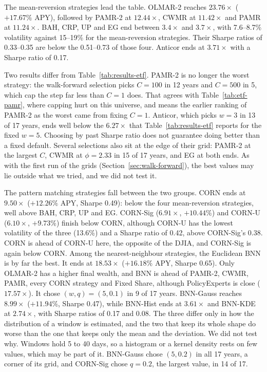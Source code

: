 \documentclass[11pt]{article}
\begin{document}
The mean-reversion strategies lead the table. OLMAR-2 reaches
$23.76\times$ ($+17.67\%$ APY), followed by PAMR-2 at $12.44\times$, CWMR
at $11.42\times$ and PAMR at $11.24\times$. BAH, CRP, UP and EG end between
$3.4\times$ and $3.7\times$, with 7.6--8.7\% volatility against 15--19\%
for the mean-reversion strategies. Their Sharpe ratios of 0.33--0.35 are
below the 0.51--0.73 of those four. Anticor ends at $3.71\times$ with a
Sharpe ratio of 0.17.

Two results differ from Table~\ref{tab:results-etf}. PAMR-2 is no longer
the worst strategy: the walk-forward selection picks $C=100$ in 12 years
and $C=500$ in 5, which cap the step far less than $C=1$ does. That
agrees with Table~\ref{tab:etf-pamr}, where capping hurt on this universe,
and means the earlier ranking of PAMR-2 as the worst came from fixing
$C=1$. Anticor, which picks $w=3$ in 13 of 17 years, ends well below the
$6.27\times$ that Table~\ref{tab:results-etf} reports for the fixed $w=5$.
Choosing by past Sharpe ratio does not guarantee doing better than a fixed
default. Several selections also sit at the edge of their grid: PAMR-2 at
the largest $C$, CWMR at $\phi=2.33$ in 15 of 17 years, and EG at both
ends. As with the first run of the grids (Section~\ref{sec:walk-forward}),
the best values may lie outside what we tried, and we did not test it.

The pattern matching strategies fall between the two groups. CORN ends at
$9.50\times$ ($+12.26\%$ APY, Sharpe 0.49): below the four
mean-reversion strategies, well above BAH, CRP, UP and EG. CORN-Sig
($6.91\times$, $+10.44\%$) and CORN-U ($6.10\times$, $+9.73\%$) finish
below CORN, although CORN-U has the lowest volatility of the three (13.6\%)
and a Sharpe ratio of 0.42, above CORN-Sig's 0.38. CORN is ahead
of CORN-U here, the opposite of the DJIA, and CORN-Sig is again below CORN.
Among the nearest-neighbour strategies, the Euclidean BNN is by far the
best. It ends at $18.53\times$ ($+16.18\%$ APY, Sharpe 0.65). Only
OLMAR-2 has a higher final wealth, and BNN is ahead of
PAMR-2, CWMR, PAMR, every CORN strategy and Fixed Share, although
PolicyExperts is close ($17.57\times$). It chose $(w,q)=(5,0.1)$ in 9 of
17 years. BNN-Gauss reaches $8.99\times$
($+11.94\%$, Sharpe 0.47), while BNN-Hist ends at $3.61\times$ and BNN-KDE
at $2.74\times$, with Sharpe ratios of 0.17 and 0.08.
The three differ only in how the distribution of a window is estimated, and
the two that keep its whole shape do worse than the one that keeps only the
mean and the deviation. We did not test why. Windows hold 5 to 40 days, so a
histogram or a kernel density rests on few values, which may be part of it.
BNN-Gauss chose $(5, 0.2)$ in all 17 years, a corner of its grid, and
CORN-Sig chose $q=0.2$, the largest value, in 14 of 17.
\end{document}
